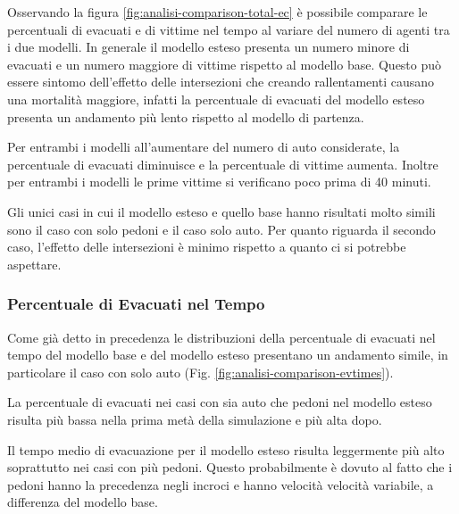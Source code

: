 Osservando la figura \ref{fig:analisi-comparison-total-ec} è possibile comparare le percentuali di evacuati e di vittime nel tempo al variare del numero di agenti tra i due modelli.
In generale il modello esteso presenta un numero minore di evacuati e un numero maggiore di vittime rispetto al modello base.
Questo può essere sintomo dell'effetto delle intersezioni che creando rallentamenti causano una mortalità maggiore,
infatti la percentuale di evacuati del modello esteso presenta un andamento più lento rispetto al modello di partenza.

Per entrambi i modelli all'aumentare del numero di auto considerate, la percentuale di evacuati diminuisce e la percentuale di vittime aumenta.
Inoltre per entrambi i modelli le prime vittime si verificano poco prima di 40 minuti.

Gli unici casi in cui il modello esteso e quello base hanno risultati molto simili sono il caso con solo pedoni e il caso solo auto.
Per quanto riguarda il secondo caso, l'effetto delle intersezioni è minimo rispetto a quanto ci si potrebbe aspettare.

\pagebreak

\subsubsection*{Percentuale di Evacuati nel Tempo}

Come già detto in precedenza le distribuzioni della percentuale di evacuati nel tempo del modello base e del modello esteso
presentano un andamento simile, in particolare il caso con solo auto (Fig. \ref{fig:analisi-comparison-evtimes}).

La percentuale di evacuati nei casi con sia auto che pedoni nel modello esteso risulta più bassa nella prima metà
della simulazione e più alta dopo.

Il tempo medio di evacuazione per il modello esteso risulta leggermente più alto soprattutto nei casi con più pedoni.
Questo probabilmente è dovuto al fatto che i pedoni hanno la precedenza negli incroci e hanno velocità velocità variabile, a differenza del modello base.


